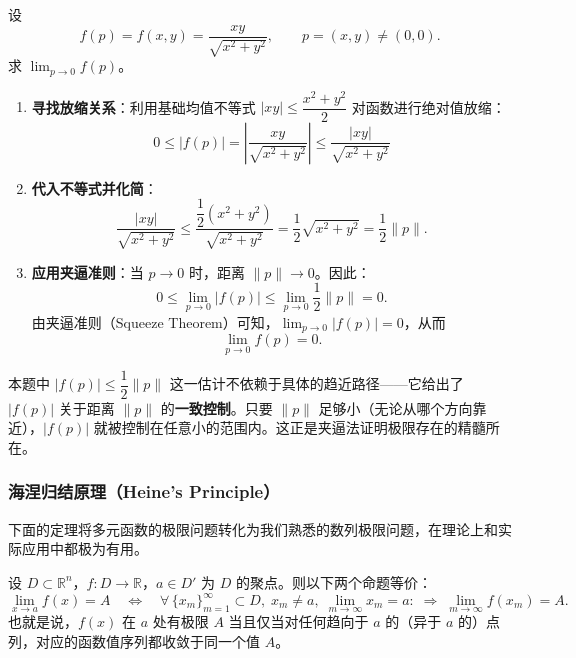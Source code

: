 \documentclass[lang=cn,11pt]{elegantbook}
\begin{document}
\begin{exercise}[利用不等式放缩求极限] \label{ex:limit-squeeze-basic}
设
\[
f(p)=f(x,y)=\frac{xy}{\sqrt{x^2+y^2}},\qquad p=(x,y) \neq (0,0).
\]
求 $\displaystyle\lim_{p\to 0}f(p)$。
\end{exercise}

\begin{solution}
\begin{enumerate}
  \item \textbf{寻找放缩关系}：利用基础均值不等式 $|xy|\leq\dfrac{x^2+y^2}{2}$ 对函数进行绝对值放缩：
  \[
  0\leq|f(p)|=\left|\frac{xy}{\sqrt{x^2+y^2}}\right|\leq\frac{|xy|}{\sqrt{x^2+y^2}}
  \]
  \item \textbf{代入不等式并化简}：
  \[
  \frac{|xy|}{\sqrt{x^2+y^2}}\leq\frac{\dfrac12(x^2+y^2)}{\sqrt{x^2+y^2}}=\frac12\sqrt{x^2+y^2}=\frac12\|p\|.
  \]
  \item \textbf{应用夹逼准则}：当 $p\to 0$ 时，距离 $\|p\|\to 0$。因此：
  \[
  0 \leqslant  \lim_{p\to 0}|f(p)| \leqslant  \lim_{p\to 0}\frac12\|p\| = 0.
  \]
  由夹逼准则（Squeeze Theorem）可知，$\displaystyle\lim_{p\to 0}|f(p)|=0$，从而
  \[
  \boxed{\lim_{p\to 0}f(p)=0}.
  \]
\end{enumerate}
\end{solution}

\begin{remark}
本题中 $|f(p)|\leq\dfrac12\|p\|$ 这一估计不依赖于具体的趋近路径——它给出了 $|f(p)|$ 关于距离 $\|p\|$ 的\textbf{一致控制}。只要 $\|p\|$ 足够小（无论从哪个方向靠近），$|f(p)|$ 就被控制在任意小的范围内。这正是夹逼法证明极限存在的精髓所在。
\end{remark}


\subsubsection{海涅归结原理（Heine's Principle）}

下面的定理将多元函数的极限问题转化为我们熟悉的数列极限问题，在理论上和实际应用中都极为有用。

\begin{theorem} \label{thm:heine-multivar}
设 $D\subset\mathbb{R}^n$，$f:D\to\mathbb{R}$，$a\in D'$ 为 $D$ 的聚点。则以下两个命题等价：
\[
\lim_{x\to a}f(x)=A
\quad\Longleftrightarrow\quad
\forall\,\{x_m\}_{m=1}^\infty\subset D,\;
x_m \neq a,\;
\lim_{m\to\infty}x_m=a:
\;\Longrightarrow\;
\lim_{m\to\infty}f(x_m)=A.
\]
也就是说，$f(x)$ 在 $a$ 处有极限 $A$ 当且仅当对任何趋向于 $a$ 的（异于 $a$ 的）点列，对应的函数值序列都收敛于同一个值 $A$。
\end{theorem}
\end{document}
